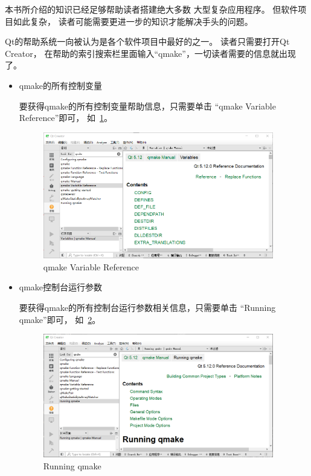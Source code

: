 本书所介绍的知识已经足够帮助读者搭建绝大多数
大型复杂应用程序。
但软件项目如此复杂，
读者可能需要更进一步的知识才能解决手头的问题。

Qt的帮助系统一向被认为是各个软件项目中最好的之一。
读者只需要打开Qt Creator，
在帮助的索引搜索栏里面输入“qmake”，一切读者需要的信息就出现了。

\begin{itemize}

\item qmake的所有控制变量

要获得qmake的所有控制变量帮助信息，只需要单击
“qmake Variable Reference”即可，
如\figurename\ \ref{p000003}。


\begin{figure}[htb] %
\centering %
\includegraphics[width=0.95\textwidth]{chapter01/images/qmake_help_1.png} %
\caption{qmake Variable Reference} %
\label{p000003} %
\end{figure}


\item qmake控制台运行参数

要获得qmake的所有控制台运行参数相关信息，只需要单击
“Running qmake”即可，
如\figurename\ \ref{p000004}。

\begin{figure}[htb] %
\centering %
\includegraphics[width=0.95\textwidth]{chapter01/images/qmake_help_2.png} %
\caption{Running qmake} %
\label{p000004} %
\end{figure}



\end{itemize}
